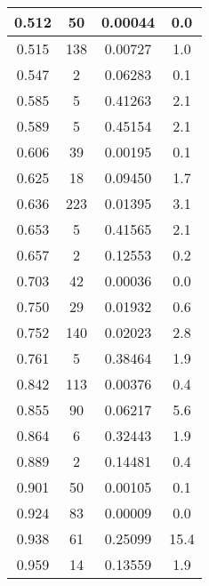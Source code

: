 \begin{longtable}{c | c | c | c}
0.512 &   50 & 0.00044 &  0.0 \\ \hline 
0.515 &  138 & 0.00727 &  1.0 \\ \hline 
0.547 &    2 & 0.06283 &  0.1 \\ \hline 
0.585 &    5 & 0.41263 &  2.1 \\ \hline 
0.589 &    5 & 0.45154 &  2.1 \\ \hline 
0.606 &   39 & 0.00195 &  0.1 \\ \hline 
0.625 &   18 & 0.09450 &  1.7 \\ \hline 
0.636 &  223 & 0.01395 &  3.1 \\ \hline 
0.653 &    5 & 0.41565 &  2.1 \\ \hline 
0.657 &    2 & 0.12553 &  0.2 \\ \hline 
0.703 &   42 & 0.00036 &  0.0 \\ \hline 
0.750 &   29 & 0.01932 &  0.6 \\ \hline 
0.752 &  140 & 0.02023 &  2.8 \\ \hline 
0.761 &    5 & 0.38464 &  1.9 \\ \hline 
0.842 &  113 & 0.00376 &  0.4 \\ \hline 
0.855 &   90 & 0.06217 &  5.6 \\ \hline 
0.864 &    6 & 0.32443 &  1.9 \\ \hline 
0.889 &    2 & 0.14481 &  0.4 \\ \hline 
0.901 &   50 & 0.00105 &  0.1 \\ \hline 
0.924 &   83 & 0.00009 &  0.0 \\ \hline 
0.938 &   61 & 0.25099 & 15.4 \\ \hline 
0.959 &   14 & 0.13559 &  1.9 \\ \hline 
\end{longtable}